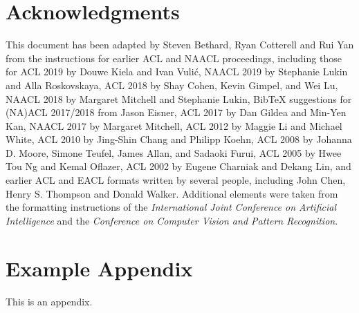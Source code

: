 \documentclass[11pt]{article}
\begin{document}
\section*{Acknowledgments}

This document has been adapted
by Steven Bethard, Ryan Cotterell and Rui Yan
from the instructions for earlier ACL and NAACL proceedings, including those for
ACL 2019 by Douwe Kiela and Ivan Vuli\'{c},
NAACL 2019 by Stephanie Lukin and Alla Roskovskaya,
ACL 2018 by Shay Cohen, Kevin Gimpel, and Wei Lu,
NAACL 2018 by Margaret Mitchell and Stephanie Lukin,
Bib\TeX{} suggestions for (NA)ACL 2017/2018 from Jason Eisner,
ACL 2017 by Dan Gildea and Min-Yen Kan,
NAACL 2017 by Margaret Mitchell,
ACL 2012 by Maggie Li and Michael White,
ACL 2010 by Jing-Shin Chang and Philipp Koehn,
ACL 2008 by Johanna D. Moore, Simone Teufel, James Allan, and Sadaoki Furui,
ACL 2005 by Hwee Tou Ng and Kemal Oflazer,
ACL 2002 by Eugene Charniak and Dekang Lin,
and earlier ACL and EACL formats written by several people, including
John Chen, Henry S. Thompson and Donald Walker.
Additional elements were taken from the formatting instructions of the \emph{International Joint Conference on Artificial Intelligence} and the \emph{Conference on Computer Vision and Pattern Recognition}.

%


\appendix

\section{Example Appendix}
\label{sec:appendix}

This is an appendix.
\end{document}
